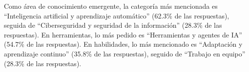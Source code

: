 Como área de conocimiento emergente, la categoría más mencionada es ``Inteligencia artificial y aprendizaje automático'' (62.3\% de las respuestas), seguida de ``Ciberseguridad y seguridad de la información'' (28.3\% de las respuestas). En herramientas, lo más pedido es ``Herramientas y agentes de IA'' (54.7\% de las respuestas). En habilidades, lo más mencionado es ``Adaptación y aprendizaje continuo'' (35.8\% de las respuestas), seguido de ``Trabajo en equipo'' (28.3\% de las respuestas).
